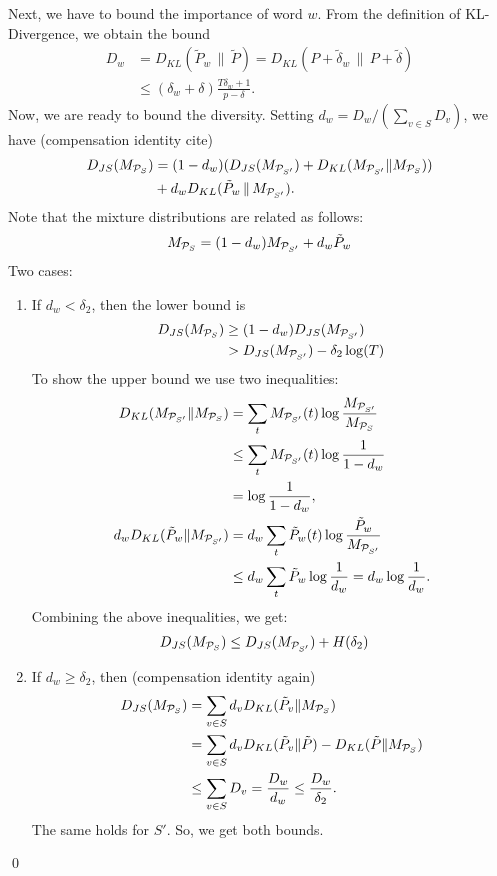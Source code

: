 \documentclass{article}
\begin{document}
Next, we have to bound the importance of word $w$. From the definition
of KL-Divergence, we obtain the bound
\begin{align*}
D_w &= D_{KL}(\tilde{P}_w\,\|\,\tilde{P})=
D_{KL}(P+\tilde{\delta}_w\,\|\, P+\tilde{\delta}) \\
&\leq
(\delta_w+\delta)\frac{T\delta_w+1}{p-\delta}.
\end{align*}
Now, we are ready to bound the diversity. Setting 
$d_w = D_w/(\sum_{v\in S}D_v)$, we have (compensation identity cite) 
\begin{align*}
D_{JS}(M_{{\mathcal P}_S})&=(1-d_w)(D_{JS}(M_{{\mathcal P}_{S'}}) +
D_{KL}(M_{{\mathcal P}_{S'}}\|M_{{\mathcal P}_S})) \\
&+ d_wD_{KL}(\tilde{P}_w\,\|\,M_{{\mathcal P}_{S'}}).
\end{align*}
Note that the mixture distributions are related as follows:
\begin{align*}
M_{{\mathcal P}_S} = (1-d_w)M_{{\mathcal P}_{S'}} + d_w \tilde{P}_w
\end{align*}
Two cases:
\begin{enumerate}
\item If $d_w<\delta_2$, then the lower bound is
\begin{align*}
D_{JS}(M_{{\mathcal P}_S})&\geq (1-d_w)D_{JS}(M_{{\mathcal P}_{S'}})\\
&>D_{JS}(M_{{\mathcal P}_{S'}}) - \delta_2\log(T) 
\end{align*}
To show the upper bound we use two inequalities:
\begin{align*}
D_{KL}(M_{{\mathcal P}_{S'}}\|M_{{\mathcal P}_S})& = \sum_t
M_{{\mathcal P}_{S'}}(t)\log\frac{M_{{\mathcal P}_{S'}}}{M_{{\mathcal P}_S}} \\ 
&\leq \sum_t M_{{\mathcal P}_{S'}}(t)\log\frac{1}{1-d_w} \\
&= \log\frac{1}{1-d_w},\\
d_w D_{KL}(\tilde{P}_w\|M_{{\mathcal P}_{S'}})&=d_w\sum_t
\tilde{P}_w(t)\log\frac{\tilde{P}_w}{ M_{{\mathcal P}_{S'}}}  \\
&\leq d_w \sum_t \tilde{P}_w \log\frac{1}{d_w} =d_w\log\frac{1}{d_w}.
\end{align*}
Combining the above inequalities, we get:
\begin{align*}
D_{JS}(M_{{\mathcal P}_S})&\leq D_{JS}(M_{{\mathcal P}_{S'}}) + H(\delta_2)
\end{align*}
\item If $d_w\geq \delta_2$, then (compensation identity again) 
\begin{align*}
D_{JS}(M_{{\mathcal P}_S})&= \sum_{v\in
S}d_vD_{KL}(\tilde{P}_v\|M_{{\mathcal P}_S})\\
&= \sum_{v\in S} d_v D_{KL}(\tilde{P}_v\|\tilde{P}) -
D_{KL}(\tilde{P}\|M_{{\mathcal P}_S})\\
&\leq \sum_{v\in S} D_v=\frac{D_w}{d_w}\leq \frac{D_w}{\delta_2}.
\end{align*}
The same holds for $S'$. So, we get both bounds.
\end{enumerate}
\qed
\end{document}
